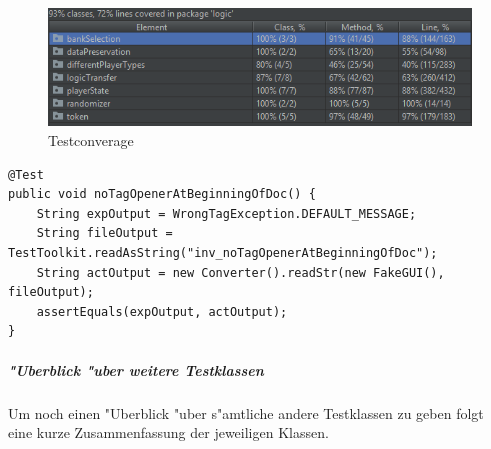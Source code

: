 \begin{figure}
	\centering
	\includegraphics{pics/testCoverage}
	\caption{Testconverage}
	\label{fig:testCoverage}
\end{figure}

\begin{lstlisting}[float,style=CodeHighlighting,caption=InvalidFileReadTests - test\_noTagOpenerAtBeginningOfDoc,label=lst:test_noTagOpenerAtBeginningOfDoc]
@Test
public void noTagOpenerAtBeginningOfDoc() {
    String expOutput = WrongTagException.DEFAULT_MESSAGE;
    String fileOutput = TestToolkit.readAsString("inv_noTagOpenerAtBeginningOfDoc");
    String actOutput = new Converter().readStr(new FakeGUI(), fileOutput);
    assertEquals(expOutput, actOutput);
}
\end{lstlisting}

\subparagraph{"Uberblick "uber weitere Testklassen}
Um noch einen "Uberblick "uber s"amtliche andere Testklassen zu geben folgt eine kurze Zusammenfassung der jeweiligen Klassen. 

